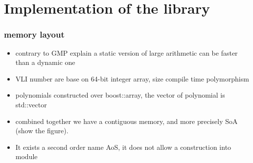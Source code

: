 \documentclass[oribibl]{llncs2e/llncs}
\begin{document}





\section{Implementation of the library}
\subsubsection{memory layout}
\begin{itemize}
\item contrary to GMP  explain a static version of large arithmetic can be faster than a dynamic one
\item   VLI number are base on 64-bit integer array, size compile time polymorphism 
\item  polynomials constructed over boost::array, the vector of polynomial is std::vector
\item combined together we have a contiguous memory, and more precisely  SoA (show the figure). 
\item  It exists a second order name AoS, it does not allow a construction into module 
\end{itemize}
\end{document}
